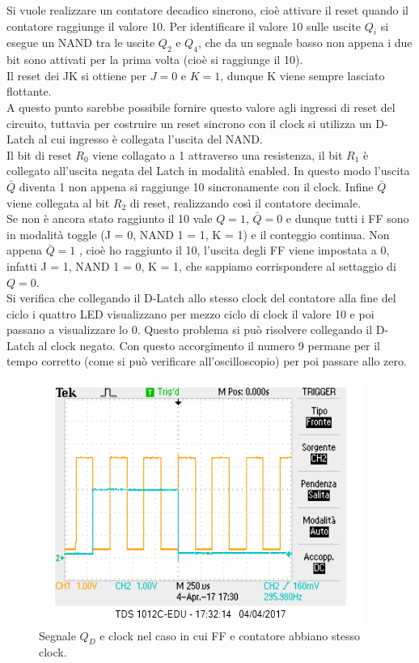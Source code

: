 \documentclass[10pt,a4paper]{article}
\begin{document}
Si vuole realizzare un contatore decadico sincrono, cioè attivare il reset quando il contatore raggiunge il valore 10. Per identificare il valore 10 sulle uscite $Q_i$ si esegue un NAND tra le uscite $Q_2$ e $Q_4$, che da un segnale basso non appena i due bit sono attivati per la prima volta (cioè si raggiunge il 10). \\
Il reset dei JK si ottiene per $J = 0$ e $K = 1$, dunque K viene sempre lasciato flottante.\\
A questo punto sarebbe possibile fornire questo valore agli ingressi di reset del circuito, tuttavia per costruire un reset sincrono con il clock si utilizza un D-Latch al cui ingresso è collegata l'uscita del NAND.\\
Il bit di reset $R_0$ viene collagato a 1 attraverso una resistenza, il bit $R_1$ è collegato all'uscita negata del Latch in modalità enabled. In questo modo l'uscita $\bar{Q}$ diventa 1 non appena si raggiunge 10 sincronamente con il clock. Infine $\bar{Q}$ viene collegata al bit $R_2$%
 di reset, realizzando così il contatore decimale.\\
Se non è ancora stato raggiunto il 10 vale $Q = 1$, $\bar{Q} = 0$ e dunque tutti i FF sono in modalità toggle (J = 0, NAND 1 = 1, K = 1) e il conteggio continua. Non appena $\bar{Q} = 1$ , cioè ho raggiunto il 10, l'uscita degli FF viene impostata a 0, infatti J = 1, NAND 1 = 0, K = 1, che sappiamo corrispondere al settaggio di $Q = 0$.\\
Si verifica che collegando il D-Latch allo stesso clock del contatore alla fine del ciclo i quattro LED visualizzano per mezzo ciclo di clock il valore 10 e poi passano a visualizzare lo 0. Questo problema si può risolvere collegando il D-Latch al clock negato. Con questo accorgimento il numero 9 permane per il tempo corretto (come si può verificare all'oscilloscopio) per poi passare allo zero.\\


\begin{figure}
\centering
\includegraphics[scale=1.0]{clocksbagliato.png}
\caption{Segnale $Q_D$ e clock nel caso in cui FF e contatore abbiano stesso clock.\label{sbagliato}}
\end{figure}
\end{document}
